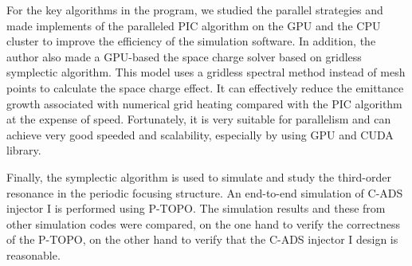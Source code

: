 For the key algorithms in the program, we studied the parallel strategies 
and made implements of the paralleled PIC algorithm on the GPU and the CPU cluster 
to improve the efficiency of the simulation software.
In addition, the author also made a GPU-based the space charge solver based on gridless symplectic algorithm.
This model uses a gridless spectral method instead of mesh points to calculate the space charge effect.
It can effectively reduce the emittance growth associated with numerical grid heating compared with the PIC algorithm at the expense of speed.
Fortunately, it is very suitable for parallelism and can achieve very good speeded and scalability, especially by using GPU and CUDA library.

Finally, the symplectic algorithm is used to simulate and study the third-order resonance in the periodic focusing structure.
An end-to-end simulation of C-ADS injector I is performed using P-TOPO.
The simulation results and these from other simulation codes were compared, on the one hand to verify the correctness of the P-TOPO, on the other hand to verify that the C-ADS injector I design is reasonable.



